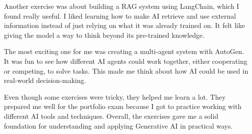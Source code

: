 \begin{enumerate}
Another exercise was about building a RAG system using LangChain, which I found really useful. I liked learning how to make AI retrieve and use external information instead of just relying on what it was already trained on. It felt like giving the model a way to think beyond its pre-trained knowledge.

The most exciting one for me was creating a multi-agent system with AutoGen. It was fun to see how different AI agents could work together, either cooperating or competing, to solve tasks. This made me think about how AI could be used in real-world decision-making.

Even though some exercises were tricky, they helped me learn a lot. They prepared me well for the portfolio exam because I got to practice working with different AI tools and techniques. Overall, the exercises gave me a solid foundation for understanding and applying Generative AI in practical ways.

    
\end{enumerate}




 

 

